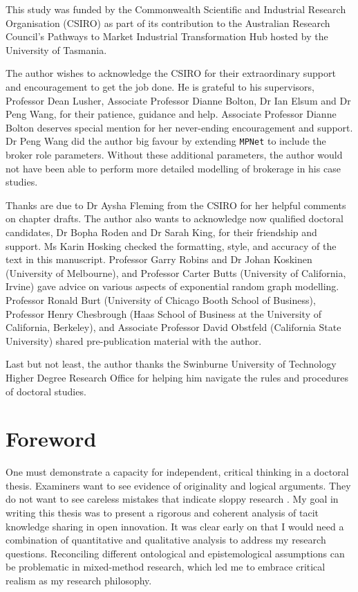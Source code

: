 \documentclass[12pt,table,xcdraw]{book}
\begin{document}
This study was funded by the Commonwealth Scientific and Industrial Research Organisation (CSIRO) as part of its contribution to the Australian Research Council's Pathways to Market Industrial Transformation Hub hosted by the University of Tasmania. \medskip

\noindent
The author wishes to acknowledge the CSIRO for their extraordinary support and encouragement to get the job done. He is grateful to his supervisors, Professor Dean Lusher, Associate Professor Dianne Bolton, Dr Ian Elsum and Dr Peng Wang, for their patience, guidance and help. Associate Professor Dianne Bolton deserves special mention for her never-ending encouragement and support. Dr Peng Wang did the author big favour by extending \texttt{MPNet} to include the \citet{gould1989structures} broker role parameters. Without these additional parameters, the author would not have been able to perform more detailed modelling of brokerage in his case studies. \medskip

Thanks are due to Dr Aysha Fleming from the CSIRO for her helpful comments on chapter drafts. The author also wants to acknowledge now qualified doctoral candidates, Dr Bopha Roden and Dr Sarah King, for their friendship and support. Ms Karin Hosking checked the formatting, style, and accuracy of the text in this manuscript. Professor Garry Robins and Dr Johan Koskinen (University of Melbourne), and Professor Carter Butts (University of California, Irvine) gave advice on various aspects of exponential random graph modelling. Professor Ronald Burt (University of Chicago Booth School of Business), Professor Henry Chesbrough (Haas School of Business at the University of California, Berkeley), and Associate Professor David Obstfeld (California State University) shared pre-publication material with the author.  \medskip

Last but not least, the author thanks the Swinburne University of Technology Higher Degree Research Office for helping him navigate the rules and procedures of doctoral studies.

\chapter*{Foreword}

One must demonstrate a capacity for independent, critical thinking in a doctoral thesis. Examiners want to see evidence of originality and logical arguments. They do not want to see careless mistakes that indicate sloppy research \citep{mullins2002its}. My goal in writing this thesis was to present a rigorous and coherent analysis of tacit knowledge sharing in open innovation. It was clear early on that I would need a combination of quantitative and qualitative analysis to address my research questions. Reconciling different ontological and epistemological assumptions can be problematic in mixed-method research, which led me to embrace critical realism as my research philosophy. \medskip
\end{document}
